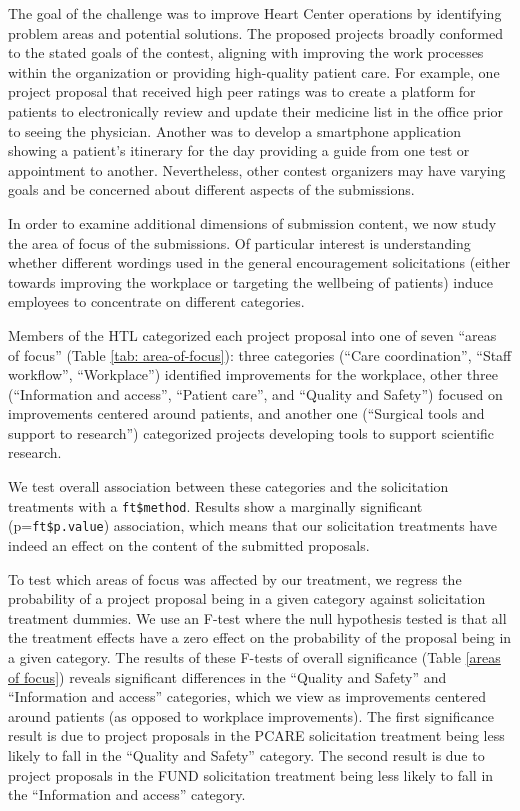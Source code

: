 \documentclass[11pt, titlepage]{article}
\begin{document}
The goal of the challenge was to improve Heart Center operations by
identifying problem areas and potential solutions. The proposed projects
broadly conformed to the stated goals of the contest, aligning with
improving the work processes within the organization or providing
high-quality patient care. For example, one project proposal that
received high peer ratings was to create a platform for patients to
electronically review and update their medicine list in the office prior
to seeing the physician. Another was to develop a smartphone application
showing a patient's itinerary for the day providing a guide from one
test or appointment to another. Nevertheless, other contest organizers
may have varying goals and be concerned about different aspects of the
submissions.

In order to examine additional dimensions of submission content, we now
study the area of focus of the submissions. Of particular interest is
understanding whether different wordings used in the general
encouragement solicitations (either towards improving the workplace or
targeting the wellbeing of patients) induce employees to concentrate on
different categories.

Members of the HTL categorized each project proposal into one of seven
``areas of focus'' (Table \ref{tab: area-of-focus}): three categories
(``Care coordination'', ``Staff workflow'', ``Workplace'') identified
improvements for the workplace, other three (``Information and access'',
``Patient care'', and ``Quality and Safety'') focused on improvements
centered around patients, and another one (``Surgical tools and support
to research'') categorized projects developing tools to support
scientific research.

We test overall association between these categories and the
solicitation treatments with a \texttt{ft\$method}. Results show a
marginally significant (p=\texttt{ft\$p.value}) association, which means
that our solicitation treatments have indeed an effect on the content of
the submitted proposals.

To test which areas of focus was affected by our treatment, we regress
the probability of a project proposal being in a given category against
solicitation treatment dummies. We use an F-test where the null
hypothesis tested is that all the treatment effects have a zero effect
on the probability of the proposal being in a given category. The
results of these F-tests of overall significance (Table
\ref{areas of focus}) reveals significant differences in the ``Quality
and Safety'' and ``Information and access'' categories, which we view as
improvements centered around patients (as opposed to workplace
improvements). The first significance result is due to project proposals
in the PCARE solicitation treatment being less likely to fall in the
``Quality and Safety'' category. The second result is due to project
proposals in the FUND solicitation treatment being less likely to fall
in the ``Information and access'' category.
\end{document}
